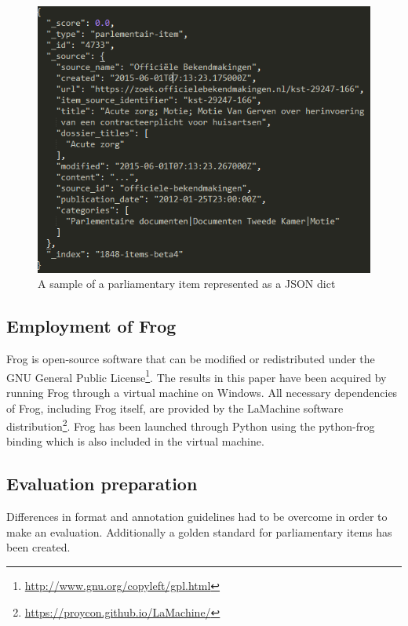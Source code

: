 \begin{figure}
    \centering
    \includegraphics[scale=0.8]{fig/data_format}
    \caption{A sample of a parliamentary item represented as a JSON dict}
    \label{fig:data_form}
\end{figure}

\subsection{Employment of Frog}\label{subsec:frog_emp}
Frog is open-source software that can be modified or redistributed under the GNU General Public License\footnote{\url{http://www.gnu.org/copyleft/gpl.html}}. The results in this paper have been acquired by running Frog through a virtual machine on Windows. All necessary dependencies of Frog, including Frog itself, are provided by the LaMachine software distribution\footnote{\url{https://proycon.github.io/LaMachine/}}. Frog has been launched through Python using the python-frog binding which is also included in the virtual machine.

\subsection{Evaluation preparation}\label{subsec:eval_prep}
Differences in format and annotation guidelines had to be overcome in order to make an evaluation. 
Additionally a golden standard for parliamentary items has been created.
